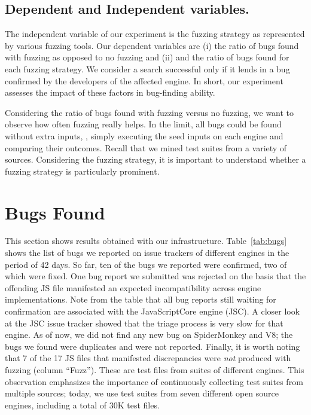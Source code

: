 \documentclass[10pt,conference,anonymous]{IEEEtran}
\begin{document}
\subsection{Dependent and Independent variables.}

The independent variable of our experiment is the fuzzing strategy as
represented by various fuzzing tools. Our dependent variables are (i)
the ratio of bugs found with fuzzing as opposed to no fuzzing and (ii)
and the ratio of bugs found for each fuzzing strategy. We consider a
search successful only if it lends in a bug confirmed by the
developers of the affected engine. In short, our experiment assesses
the impact of these factors in bug-finding ability.

Considering the ratio of bugs found with fuzzing versus no fuzzing, we
want to observe how often fuzzing really helps. In the limit, all bugs
could be found without extra inputs, \ie{}, simply executing the seed
inputs on each engine and comparing their outcomes. Recall that we
mined test suites from a variety of sources. Considering the fuzzing
strategy, it is important to understand whether a fuzzing strategy is
particularly prominent.

\section{Bugs Found}
\label{sec:results}


This section shows results obtained with our
infrastructure. Table~\ref{tab:bugs} shows the list of bugs we
reported on issue trackers of different engines in the period of 42
days. So far, ten of the bugs we reported
were confirmed, two of which were fixed. One bug report we
submitted was rejected on the basis that the offending JS file
manifested an expected incompatibility across engine
implementations.
Note from the table that all bug
reports still waiting for confirmation are associated with the
JavaScriptCore engine (JSC). A closer look at the JSC issue tracker
showed that the triage process is very slow for that engine. As of
now, we did not find any new bug on SpiderMonkey and V8; the bugs we
found were duplicates and were not reported. Finally, it is
worth noting that 7 of the 17 JS files that manifested
discrepancies were \emph{not} produced with fuzzing (column
``Fuzz''). These are test files from suites of different engines. This
observation emphasizes the importance of continuously collecting test suites from
multiple sources; today, we use test suites from seven different open
source engines, including a total of 30K test files.
\end{document}
